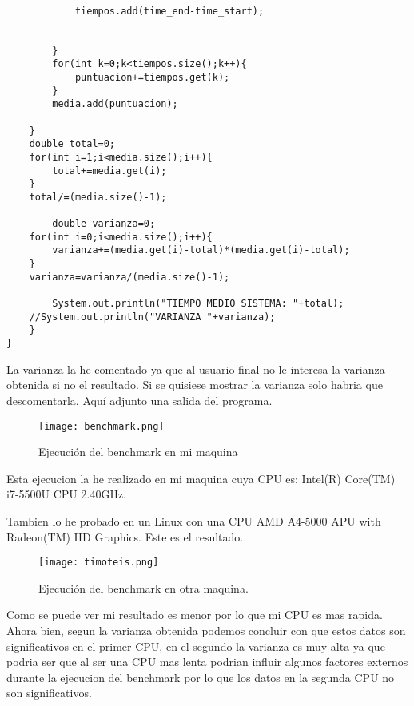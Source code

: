 \begin{verbatim}
		
		    tiempos.add(time_end-time_start);
		
			
		}
		for(int k=0;k<tiempos.size();k++){
			puntuacion+=tiempos.get(k);   
		}
		media.add(puntuacion);
		
	}
	double total=0;
	for(int i=1;i<media.size();i++){
		total+=media.get(i);
	}
	total/=(media.size()-1);
	
        double varianza=0;
	for(int i=0;i<media.size();i++){
		varianza+=(media.get(i)-total)*(media.get(i)-total);
	}	
	varianza=varianza/(media.size()-1);
        
        System.out.println("TIEMPO MEDIO SISTEMA: "+total);
	//System.out.println("VARIANZA "+varianza);
    }   
}
\end{verbatim}
La varianza la he comentado ya que al usuario final no le interesa la varianza obtenida si no el resultado.
Si se quisiese mostrar la varianza solo habria que descomentarla. 
Aquí adjunto una salida del programa.

\begin{figure}[H] 
\centering
\texttt{[image: benchmark.png]}  
\label{figura45:}
\caption{Ejecución del benchmark en mi maquina}
\end{figure}
Esta ejecucion la he realizado en mi maquina cuya CPU es:
Intel(R) Core(TM) i7-5500U CPU \@ 2.40GHz.

Tambien lo he probado en un Linux con una CPU AMD A4-5000 APU with Radeon(TM) HD Graphics. Este es el resultado.
\begin{figure}[H] 
\centering
\texttt{[image: timoteis.png]}  
\label{figura46:}
\caption{Ejecución del benchmark en otra maquina.}
\end{figure}
Como se puede ver mi resultado es menor por lo que mi CPU es mas rapida. Ahora bien, segun la varianza obtenida podemos concluir con que estos datos son significativos en el primer CPU, en el segundo la varianza es muy alta ya que podria ser que al ser una CPU mas lenta podrian influir algunos factores externos durante la ejecucion del benchmark por lo que los datos en la segunda CPU no son significativos.

